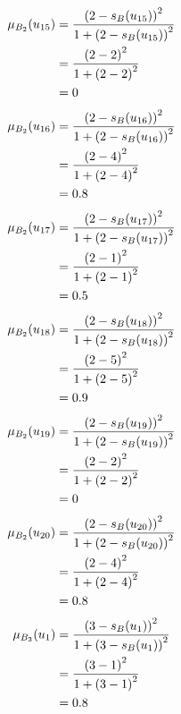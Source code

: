 \documentclass[a4paper,openany]{book}
\begin{document}
				\begin{align}
					\mu_{B_2}(u_{15}) &= \frac{\left(2-s_B(u_{15})\right)^2}{1 + \left(2-s_B(u_{15})\right)^2}\\
					&= \frac{\left(2-2\right)^2}{1 + \left(2-2\right)^2} \notag \\
					&= 0 \notag
				\end{align}
				\begin{align}
					\mu_{B_2}(u_{16}) &= \frac{\left(2-s_B(u_{16})\right)^2}{1 + \left(2-s_B(u_{16})\right)^2}\\
					&= \frac{\left(2-4\right)^2}{1 + \left(2-4\right)^2} \notag \\
					&= 0.8 \notag
				\end{align}
				\begin{align}
					\mu_{B_2}(u_{17}) &= \frac{\left(2-s_B(u_{17})\right)^2}{1 + \left(2-s_B(u_{17})\right)^2}\\
					&= \frac{\left(2-1\right)^2}{1 + \left(2-1\right)^2} \notag \\
					&= 0.5 \notag
				\end{align}
				\begin{align}
					\mu_{B_2}(u_{18}) &= \frac{\left(2-s_B(u_{18})\right)^2}{1 + \left(2-s_B(u_{18})\right)^2}\\
					&= \frac{\left(2-5\right)^2}{1 + \left(2-5\right)^2} \notag \\
					&= 0.9 \notag
				\end{align}
				\begin{align}
					\mu_{B_2}(u_{19}) &= \frac{\left(2-s_B(u_{19})\right)^2}{1 + \left(2-s_B(u_{19})\right)^2}\\
					&= \frac{\left(2-2\right)^2}{1 + \left(2-2\right)^2} \notag \\
					&= 0 \notag
				\end{align}
				\begin{align}
					\mu_{B_2}(u_{20}) &= \frac{\left(2-s_B(u_{20})\right)^2}{1 + \left(2-s_B(u_{20})\right)^2}\\
					&= \frac{\left(2-4\right)^2}{1 + \left(2-4\right)^2} \notag \\
					&= 0.8 \notag
				\end{align}
				\begin{align}
					\mu_{B_3}(u_1) &= \frac{\left(3-s_B(u_1)\right)^2}{1 + \left(3-s_B(u_1)\right)^2}\\
					&= \frac{\left(3-1\right)^2}{1 + \left(3-1\right)^2} \notag \\
					&= 0.8 \notag
				\end{align}
\end{document}
